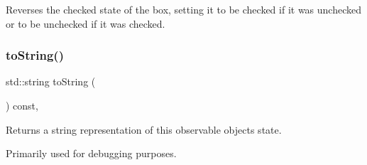 Reverses the checked state of the box, setting it to be checked if it was unchecked or to be unchecked if it was checked. 

\mbox{\label{classGObservable_a1fe5121d6528fdea3f243321b3fa3a49}} 
\subsubsection{\texorpdfstring{to\+String()}{toString()}}
{\footnotesize\ttfamily std\+::string to\+String (\begin{DoxyParamCaption}{ }\end{DoxyParamCaption}) const\hspace{0.3cm}{\ttfamily [virtual]}, {\ttfamily [inherited]}}



Returns a string representation of this observable object\textquotesingle{}s state. 

Primarily used for debugging purposes. 